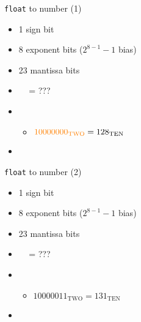 \begin{frame}{\texttt{float} to number (1)}
\begin{itemize}
\item 1 sign bit
\item 8 exponent bits ($2^{8-1}-1$ bias)
\item 23 mantissa bits
\vspace{.5cm}
\item {\fontsize{12}{13}\selectfont\texttt{$\;$$\;\;$} = ???}
\item<2->
    \iftoggle{heldback}{}{$\myemph<3>{\color<2,4->{blue!70!black}-}1.\myemph<5>{1100\ldots}\cdot 2^{\myemph<4>{{\color<2-3,5->{orange}128} - 127 = 1}} = -11.1 = -3.5_\text{TEN}$}
        \begin{itemize}
            \item<4-> ${\color{orange}10000000_\text{TWO}} = 128_\text{TEN}$
        \end{itemize}
\item<5-> \iftoggle{heldback}{}{or $-1.11\cdot2^1 = -(2^0 + 2^{-1} + 2^{-2})2^1 = -(1.75)\cdot2 = -3.5$}
\end{itemize}
\end{frame}

\begin{frame}{\texttt{float} to number (2)}
\begin{itemize}
\item 1 sign bit
\item 8 exponent bits ($2^{8-1}-1$ bias)
\item 23 mantissa bits
\vspace{.5cm}
\item {\fontsize{12}{13}\selectfont\texttt{$\;$$\;\;$} = ???}
\item<2->
    \iftoggle{heldback}{}{$\myemph<3>{\color<2,4->{blue!70!black}+}1.\myemph<5>{10010000\ldots}\cdot 2^{\myemph<4>{{\color<2-3,5->{orange}131} - 127 = 4}} = +1.1001\cdot2^4 = +11001 = 25_\text{TEN}$}
        \begin{itemize}
            \item<4> $10000011_\text{TWO} = 131_\text{TEN}$
        \end{itemize}
\item<6->
    \iftoggle{heldback}{}{or $(2^0 + 2^{-1} + 2^{-4})2^4 = (1 + .5 + .0625)16 = (1.5625)16 = 25$}
\end{itemize}
\end{frame}


